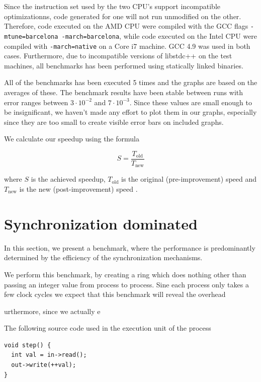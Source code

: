 Since the instruction set used by the two CPU's support incompatible
optimizationns, code generated for one will not run unmodified on the
other. Therefore, code executed on the AMD CPU were compiled with the
GCC flags \texttt{-mtune=barcelona -march=barcelona}, while code
executed on the Intel CPU were compiled with \texttt{-march=native} on
a Core i7 machine. GCC 4.9 was used in both cases. Furthermore,
due to incompatible versions of libstdc++ on the test machines, all
benchmarks has been performed using statically linked binaries.

All of the benchmarks has been executed 5 times and the graphs are
based on the averages of these. The benchmark results have been stable
between runs with error ranges between $3\cdot10^{-2}$ and
$7\cdot10^{-3}$. Since these values are small enough to be
insignificant, we haven't made any effort to plot them in our graphs,
especially since they are too small to create visible error bars on
included graphs.

We calculate our speedup using the formula

\begin{equation*}
S = \frac{T_{\text{old}}}{T_{\text{new}}}
\end{equation*}

where $S$ is the achieved speedup, $T_{\text{old}}$ is the original
(pre-improvement) speed and $T_{\text{new}}$ is the new
(post-improvement) speed \cite{hennessy2012computer}.

\section{Synchronization dominated}
In this section, we present a benchmark, where the performance is
predominantly determined by the efficiency of the synchronization
mechanisms.

We perform this benchmark, by creating a ring which does nothing other
than passing an integer value from process to process. Sine each process
only takes a few clock cycles we expect that this benchmark will
reveal the overhead 

urthermore, since we actually 
e

The following source code used in the execution unit of the process
\begin{verbatim}
void step() {
  int val = in->read();
  out->write(++val);
}
\end{verbatim}

